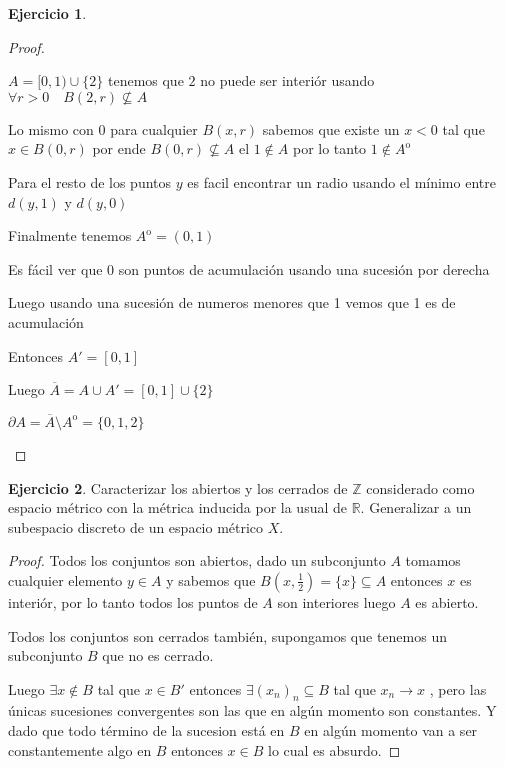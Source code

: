 \documentclass[12pt]{report}
\newcommand{\R}{\mathbb{R}}
\newcommand{\Z}{\mathbb{Z}}
\newcommand{\ra}{\rightarrow}
\newcommand{\ol}{\overline}
\newcommand{\open}{\mathrm{o}}
\theoremstyle{definition}
\newtheorem{ej}{Ejercicio}
\begin{document}
\begin{ej}
\begin{proof}
\begin{enumerate}
$A = [0,1) \cup \{2\}$ tenemos que $2$ no puede ser interiór usando $\forall r > 0 \quad B(2,r) \not\subseteq A$

Lo mismo con $0$ para cualquier $B(x,r)$ sabemos que existe un $x < 0$ tal que $x \in B(0,r)$ por ende $B(0,r) \not\subseteq A$ el $1 \notin A$ por lo tanto $1 \notin A^{\open}$

Para el resto de los puntos $y$ es facil encontrar un radio usando el mínimo entre $d(y,1)$ y $d(y,0)$  

Finalmente tenemos $A^{\open} = (0,1)$

Es fácil ver que $0$ son puntos de acumulación usando una sucesión por derecha

Luego usando una sucesión de numeros menores que 1 vemos que 1 es de acumulación 

Entonces $A' = [0,1] $

Luego $\ol A = A \cup A' = [0,1] \cup \{2\}$

$ \partial A = \ol{A} \setminus A^{\open} = \{0,1,2\} $
    \end{enumerate} 
  \end{proof}
\end{ej}

\begin{ej}
  Caracterizar los abiertos y los cerrados de $\Z$ considerado como espacio métrico con la métrica inducida por la usual de $\R$. Generalizar a un subespacio discreto de un espacio métrico $X$.
  \begin{proof}
     Todos los conjuntos son abiertos, dado un subconjunto $A$ tomamos cualquier elemento $y\in A$ y sabemos que $B(x,\frac{1}{2})=\{x\} \subseteq A$ entonces $x $ es interiór, por lo tanto todos los puntos de $A$ son interiores luego $A$ es abierto.

     Todos los conjuntos son cerrados también, supongamos que tenemos un subconjunto $B$ que no es cerrado.

     Luego $\exists x \notin B$ tal que $x \in B'$ entonces  $\exists (x_n)_n \subseteq B$ tal que $x_n \ra x$ , pero las únicas sucesiones convergentes son las que en algún momento son constantes. Y dado que todo término de la sucesion está en $B$ en algún momento van a ser constantemente algo en $B$ entonces $x \in B$ lo cual es absurdo.
  \end{proof}
\end{ej}
\end{document}
